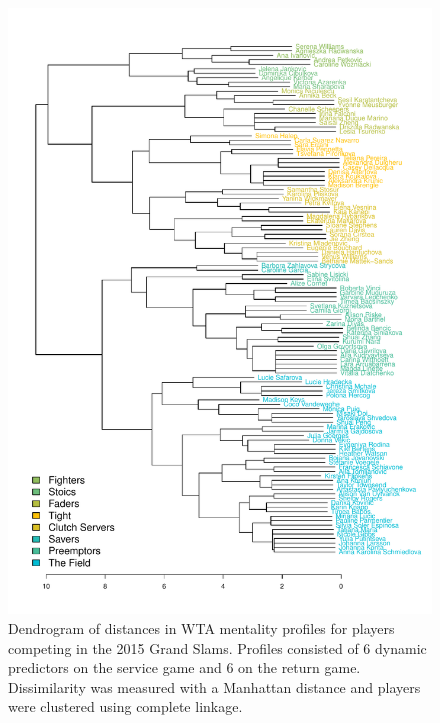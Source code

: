 \documentclass{Latex/svjour3}
\begin{document}
\begin{figure}
\includegraphics[scale=0.9]{figs/wta_dendro_std_fixed.pdf}
\caption{Dendrogram of distances in WTA mentality profiles for players competing
  in the 2015 Grand Slams. Profiles consisted of 6 dynamic predictors on the
  service game and 6 on the return game. Dissimilarity was measured with a
  Manhattan distance and players were clustered using complete linkage.}
\label{fig:wta_dendro}
\end{figure}

\clearpage
\end{document}
